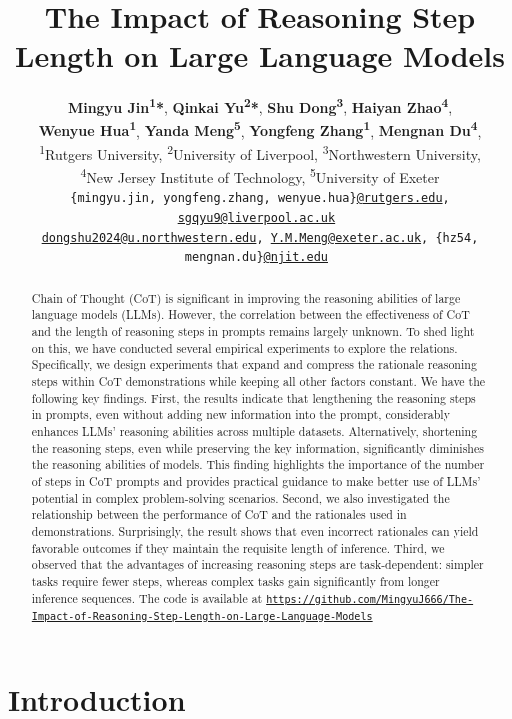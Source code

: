 \documentclass[11pt]{article}
\title{The Impact of Reasoning Step Length on Large Language Models}
\author{
 \textbf{Mingyu Jin\textsuperscript{1}*},
 \textbf{Qinkai Yu\textsuperscript{2}*},
 \textbf{Shu Dong\textsuperscript{3}},
 \textbf{Haiyan Zhao\textsuperscript{4}},
\\
 \textbf{Wenyue Hua\textsuperscript{1}},
 \textbf{Yanda Meng\textsuperscript{5}},
 \textbf{Yongfeng Zhang\textsuperscript{1}},
 \textbf{Mengnan Du\textsuperscript{4}},
\\
 \textsuperscript{1}Rutgers University,
 \textsuperscript{2}University of Liverpool,
 \textsuperscript{3}Northwestern University,\\
 \textsuperscript{4}New Jersey Institute of Technology,
 \textsuperscript{5}University of Exeter
\\
 \small{
 \texttt{\{mingyu.jin, yongfeng.zhang, wenyue.hua\}\href{mailto:@rutgers.edu}{@rutgers.edu}, \href{mailto:sgqyu9@liverpool.ac.uk}{sgqyu9@liverpool.ac.uk}
 }}
 \\
 \small\texttt{{\href{mailto:dongshu2024@u.northwestern.edu}{dongshu2024@u.northwestern.edu}, \href{mailto:Y.M.Meng@exeter.ac.uk}{Y.M.Meng@exeter.ac.uk},
 \{hz54, mengnan.du\}\href{mailto:@njit.edu}{@njit.edu}
 }}
}
\begin{document}
\maketitle
\begin{abstract}
Chain of Thought (CoT) is significant in improving the reasoning abilities of large language models (LLMs). However, the correlation between the effectiveness of CoT and the length of reasoning steps in prompts remains largely unknown. To shed light on this, we have conducted several empirical experiments to explore the relations. Specifically, we design experiments that expand and compress the rationale reasoning steps within CoT demonstrations while keeping all other factors constant. We have the following key findings. First, the results indicate that lengthening the reasoning steps in prompts, even without adding new information into the prompt, considerably enhances LLMs' reasoning abilities across multiple datasets. Alternatively, shortening the reasoning steps, even while preserving the key information, significantly diminishes the reasoning abilities of models. This finding highlights the importance of the number of steps in CoT prompts and provides practical guidance to make better use of LLMs' potential in complex problem-solving scenarios. Second, we also investigated the relationship between the performance of CoT and the rationales used in demonstrations. Surprisingly, the result shows that even incorrect rationales can yield favorable outcomes if they maintain the requisite length of inference. Third, we observed that the advantages of increasing reasoning steps are task-dependent: simpler tasks require fewer steps, whereas complex tasks gain significantly from longer inference sequences. The code is available at
\href{https://github.com/MingyuJ666/The-Impact-of-Reasoning-Step-Length-on-Large-Language-Models}{%
    \nolinkurl{https://github.com/MingyuJ666/The-Impact-of-Reasoning-Step-Length-on-Large-Language-Models}
}

\end{abstract}
%

\phantom{Invisible Text}
\vspace{-\baselineskip}

\section{Introduction}
\end{document}
